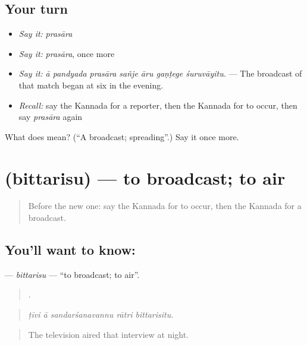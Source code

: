 \subsection*{Your turn}
\begin{itemize}
\raggedright
  \item \emph{Say it:} \emph{prasāra}
  \item \emph{Say it:} \emph{prasāra}, once more
  \item \emph{Say it:} \emph{ā pandyada prasāra sañje āru gaṇṭege śuruvāyitu.} — The broadcast of that match began at six in the evening.
  \item \emph{Recall:} say the Kannada for a reporter, then the Kannada for to occur, then say \emph{prasāra} again
\end{itemize}

\begin{tcolorbox}[breakable,colback=teal!4,colframe=teal!35!black,title={Before you move on}]
What does  mean? (\textquotedblleft{}A broadcast; spreading\textquotedblright{}.) Say it once more.
\end{tcolorbox}
\section[\texorpdfstring{\kn{ಬಿತ್ತರಿಸು} (bittarisu)}{ಬಿತ್ತರಿಸು (bittarisu)}]{ (bittarisu) — to broadcast; to air}

\label{lesson:KA-C320-bittarisu}



\begin{quote}
Before the new one: say the Kannada for to occur, then the Kannada for a broadcast.
\end{quote}

\subsection*{You'll want to know: }
\textbf{} — \emph{bittarisu} — \textquotedblleft{}to broadcast; to air\textquotedblright{}.

\begin{quote}
    .
\end{quote}

\begin{quote}
\emph{ṭīvi ā sandarśanavannu rātri bittarisitu.}
\end{quote}

\begin{quote}
The television aired that interview at night.
\end{quote}

